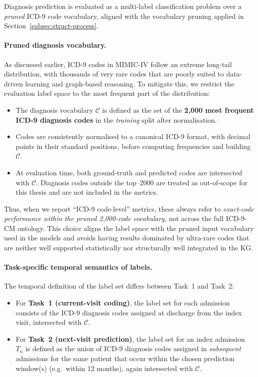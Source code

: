 Diagnosis prediction is evaluated as a multi-label classification problem over a \emph{pruned} ICD-9 code vocabulary, aligned with the vocabulary pruning applied in Section~\ref{subsec:struct-process}.

\paragraph{Pruned diagnosis vocabulary.}

As discussed earlier, ICD-9 codes in MIMIC-IV follow an extreme long-tail distribution, with thousands of very rare codes that are poorly suited to data-driven learning and graph-based reasoning. To mitigate this, we restrict the evaluation label space to the most frequent part of the distribution:

\begin{itemize}
    \item The diagnosis vocabulary $\mathcal{C}$ is defined as the set of the \textbf{2{,}000 most frequent ICD-9 diagnosis codes} in the \emph{training} split after normalisation.
    \item Codes are consistently normalised to a canonical ICD-9 format, with decimal points in their standard positions, before computing frequencies and building $\mathcal{C}$.
    \item At evaluation time, both ground-truth and predicted codes are intersected with $\mathcal{C}$. Diagnosis codes outside the top--2000 are treated as out-of-scope for this thesis and are not included in the metrics.
\end{itemize}

Thus, when we report ``ICD-9 code-level'' metrics, these always refer to \emph{exact-code performance within the pruned 2{,}000-code vocabulary}, not across the full ICD-9-CM ontology. This choice aligns the label space with the pruned input vocabulary used in the models and avoids having results dominated by ultra-rare codes that are neither well supported statistically nor structurally well integrated in the KG.

\paragraph{Task-specific temporal semantics of labels.}

The temporal definition of the label set differs between Task~1 and Task~2:

\begin{itemize}
    \item For \textbf{Task~1 (current-visit coding)}, the label set for each admission consists of the ICD-9 diagnosis codes assigned at discharge from the index visit, intersected with $\mathcal{C}$.
    \item For \textbf{Task~2 (next-visit prediction)}, the label set for an index admission \(T_n\) is defined as the union of ICD-9 diagnosis codes assigned in \emph{subsequent} admissions for the same patient that occur within the chosen prediction window(s) (e.g.\ within 12 months), again intersected with $\mathcal{C}$.
\end{itemize}

